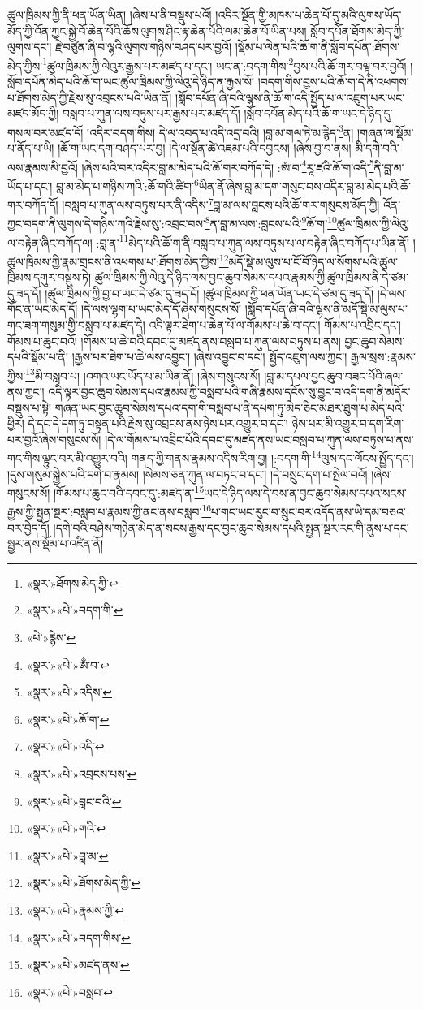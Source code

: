 ཚུལ་ཁྲིམས་ཀྱི་ནི་ཕན་ཡོན་ཡིན། །ཞེས་པ་ནི་བསྡུས་པའོ། །འདིར་སྔོན་གྱི་མཁས་པ་ཆེན་པོ་དུ་མའི་ལུགས་ཡོད་མོད་ཀྱི་འོན་ཀྱང་སྐྱེ་བོ་ཆེན་པོའི་ཆོས་ལུགས་ཤིང་རྟ་ཆེན་པོའི་ལམ་ཆེན་པོ་ཡིན་པས། སློབ་དཔོན་ཐོགས་མེད་ཀྱི་ལུགས་དང་། རྗེ་བཙུན་ཞི་བ་ལྷའི་ལུགས་གཉིས་བཤད་པར་བྱའོ། །སྡོམ་པ་ལེན་པའི་ཆོ་ག་ནི་སློབ་དཔོན་:ཐོགས་མེད་ཀྱིས་\footnote{«སྣར་»ཐོགས་མེད་ཀྱི་}ཚུལ་ཁྲིམས་ཀྱི་ལེའུར་རྒྱས་པར་མཛད་པ་དང་། ཡང་ན་:བདག་གིས་\footnote{«སྣར་»«པེ་»བདག་གི་}བྱས་པའི་ཆོ་གར་བལྟ་བར་བྱའོ། །སློབ་དཔོན་མེད་པའི་ཆོ་ག་ཡང་ཚུལ་ཁྲིམས་ཀྱི་ལེའུ་དེ་ཉིད་ན་རྒྱས་སོ། །བདག་གིས་བྱས་པའི་ཆོ་ག་དེ་ནི་འཕགས་པ་ཐོགས་མེད་ཀྱི་རྗེས་སུ་འབྲངས་པའི་ཡིན་ནོ། །སློབ་དཔོན་ཞི་བའི་ལྷས་ནི་ཆོ་ག་འདི་སྤྱོད་པ་ལ་འཇུག་པར་ཡང་མཛད་མོད་ཀྱི། བསླབ་པ་ཀུན་ལས་བཏུས་པར་རྒྱས་པར་མཛད་དོ། །སློབ་དཔོན་མེད་པའི་ཆོ་ག་ཡང་དེ་ཉིད་དུ་གསལ་བར་མཛད་དོ། །འདིར་བདག་གིས། དེ་ལ་འབད་པ་འདི་འདྲ་བའི། །བླ་མ་གལ་ཏེ་མ་རྙེད་\footnote{«པེ་»རྙེས་}ན། །གཞན་ལ་སྡོམ་པ་ནོད་པ་ཡི། །ཆོ་ག་ཡང་དག་བཤད་པར་བྱ། །དེ་ལ་སྔོན་ཚེ་འཇམ་པའི་དབྱངས། །ཞེས་བྱ་བ་ནས། མི་དགེ་བའི་ལས་རྣམས་མི་བྱའོ། །ཞེས་པའི་བར་འདིར་བླ་མ་མེད་པའི་ཆོ་གར་བཀོད་དེ། :ཨཾ་བ་\footnote{«སྣར་»«པེ་»ཨྃ་བ་}རཱ་ཛའི་ཆོ་ག་འདི་\footnote{«སྣར་»«པེ་»འདིས་}ནི་བླ་མ་ཡོད་པ་དང་། བླ་མ་མེད་པ་གཉིས་ཀའི་:ཆོ་གའི་ཚིག་\footnote{«སྣར་»«པེ་»ཆོ་ག་}ཡིན་ནོ་ཞེས་བླ་མ་དག་གསུང་བས་འདིར་བླ་མ་མེད་པའི་ཆོ་གར་བཀོད་དོ། །བསླབ་པ་ཀུན་ལས་བཏུས་པར་ནི་འདིས་\footnote{«སྣར་»«པེ་»འདི་}བླ་མ་ལས་བླངས་པའི་ཆོ་གར་གསུངས་མོད་ཀྱི། འོན་ཀྱང་བདག་ནི་ལུགས་དེ་གཉིས་ཀའི་རྗེས་སུ་:འབྲང་བས་\footnote{«སྣར་»«པེ་»འབྲངས་པས་}ན་བླ་མ་ལས་:བླངས་པའི་\footnote{«སྣར་»«པེ་»བླང་བའི་}ཆོ་ག་\footnote{«སྣར་»«པེ་»གའི་}ཚུལ་ཁྲིམས་ཀྱི་ལེའུ་ལ་བརྟེན་ཞིང་བཀོད་ལ། :བླ་ན་\footnote{«སྣར་»«པེ་»བླ་མ་}མེད་པའི་ཆོ་ག་ནི་བསླབ་པ་ཀུན་ལས་བཏུས་པ་ལ་བརྟེན་ཞིང་བཀོད་པ་ཡིན་ནོ། །ཚུལ་ཁྲིམས་ཀྱི་རྣམ་གྲངས་ནི་འཕགས་པ་:ཐོགས་མེད་ཀྱིས་\footnote{«སྣར་»«པེ་»ཐོགས་མེད་ཀྱི་}མདོ་སྡེ་མ་ལུས་པ་ངོ་བོ་ཉིད་ལ་སོགས་པའི་ཚུལ་ཁྲིམས་དགུར་བསྡུས་ཏེ། ཚུལ་ཁྲིམས་ཀྱི་ལེའུ་དེ་ཉིད་ལས་བྱང་ཆུབ་སེམས་དཔའ་རྣམས་ཀྱི་ཚུལ་ཁྲིམས་ནི་དེ་ཙམ་དུ་ཟད་དོ། །ཚུལ་ཁྲིམས་ཀྱི་བྱ་བ་ཡང་དེ་ཙམ་དུ་ཟད་དོ། །ཚུལ་ཁྲིམས་ཀྱི་ཕན་ཡོན་ཡང་དེ་ཙམ་དུ་ཟད་དོ། །དེ་ལས་གོང་ན་ཡང་མེད་དོ། །དེ་ལས་ལྷག་པ་ཡང་མེད་དོ་ཞེས་གསུངས་སོ། །སློབ་དཔོན་ཞི་བའི་ལྷས་ནི་མདོ་སྡེ་མ་ལུས་པ་གང་ཟག་གསུམ་གྱི་བསླབ་པ་མཛད་དེ། འདི་ལྟར་ཐེག་པ་ཆེན་པོ་ལ་གོམས་པ་ཆེ་བ་དང་། གོམས་པ་འབྲིང་དང་། གོམས་པ་ཆུང་བའོ། །གོམས་པ་ཆེ་བའི་དབང་དུ་མཛད་ནས་བསླབ་པ་ཀུན་ལས་བཏུས་པ་ནས། བྱང་ཆུབ་སེམས་དཔའི་སྡོམ་པ་ནི། །རྒྱས་པར་ཐེག་པ་ཆེ་ལས་འབྱུང་། །ཞེས་འབྱུང་བ་དང་། སྤྱོད་འཇུག་ལས་ཀྱང་། རྒྱལ་སྲས་:རྣམས་ཀྱིས་\footnote{«སྣར་»«པེ་»རྣམས་ཀྱི་}མི་བསླབ་པ། །འགའ་ཡང་ཡོད་པ་མ་ཡིན་ནོ། །ཞེས་གསུངས་སོ། །བླ་མ་དཔལ་བྱང་ཆུབ་བཟང་པོའི་ཞལ་ནས་ཀྱང་། འདི་ལྟར་བྱང་ཆུབ་སེམས་དཔའ་རྣམས་ཀྱི་བསླབ་པའི་གཞི་རྣམས་དངོས་སུ་བྱུང་བ་འདི་དག་ནི་མདོར་བསྡུས་པ་སྟེ། གཞན་ཡང་བྱང་ཆུབ་སེམས་དཔའ་དག་གི་བསླབ་པ་ནི་དཔག་ཏུ་མེད་ཅིང་མཐར་ཐུག་པ་མེད་པའི་ཕྱིར། དེ་དང་དེ་དག་ཏུ་བསྟན་པའི་རྗེས་སུ་འབྲངས་ནས་ཉེས་པར་འགྱུར་བ་དང་། ཉེས་པར་མི་འགྱུར་བ་དག་རིག་པར་བྱའོ་ཞེས་གསུངས་སོ། །དེ་ལ་གོམས་པ་འབྲིང་པོའི་དབང་དུ་མཛད་ནས་ཡང་བསླབ་པ་ཀུན་ལས་བཏུས་པ་ནས་གང་གིས་ལྟུང་བར་མི་འགྱུར་བའི། གནད་ཀྱི་གནས་རྣམས་འདིས་རིག་བྱ། །:བདག་གི་\footnote{«སྣར་»«པེ་»བདག་གིས་}ལུས་དང་ལོངས་སྤྱོད་དང་། །དུས་གསུམ་སྐྱེས་པའི་དགེ་བ་རྣམས། །སེམས་ཅན་ཀུན་ལ་བཏང་བ་དང་། །དེ་བསྲུང་དག་པ་སྤེལ་བའོ། །ཞེས་གསུངས་སོ། །གོམས་པ་ཆུང་བའི་དབང་དུ་:མཛད་ན་\footnote{«སྣར་»«པེ་»མཛད་ནས་}ཡང་དེ་ཉིད་ལས་དེ་བས་ན་བྱང་ཆུབ་སེམས་དཔའ་སངས་རྒྱས་ཀྱི་སྤྱན་སྔར་:བསླབ་པ་རྣམས་ཀྱི་ནང་ནས་བསླབ་\footnote{«སྣར་»«པེ་»བསླབ་}པ་གང་ཡང་རུང་བ་སྲུང་བར་འདོད་ནས་ཡི་དམ་བཅའ་བར་བྱེད་དོ། །དགེ་བའི་བཤེས་གཉེན་མེད་ན་སངས་རྒྱས་དང་བྱང་ཆུབ་སེམས་དཔའི་སྤྱན་སྔར་རང་གི་ནུས་པ་དང་སྦྱར་ནས་སྡོམ་པ་འཛིན་ནོ། 